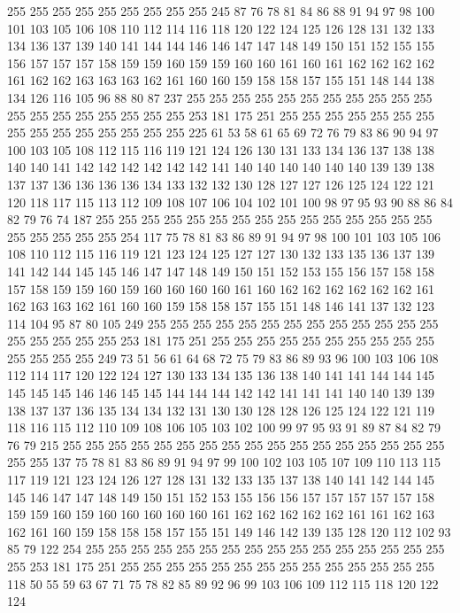 255 255 255 255 255 255 255 255 255 245 87 76 78 81 84 86 88 91 94 97
98 100 101 103 105 106 108 110 112 114 116 118 120 122 124 125 126 128 131 132
133 134 136 137 139 140 141 144 144 146 146 147 147 148 149 150 151 152 155 155
156 157 157 157 158 159 159 160 159 159 160 160 161 160 161 162 162 162 162 161
162 162 163 163 163 162 161 160 160 159 158 158 157 155 151 148 144 138 134 126
116 105 96 88 80 87 237 255 255 255 255 255 255 255 255 255 255 255 255 255
255 255 255 255 255 255 253 181 175 251 255 255 255 255 255 255 255 255 255 255
255 255 255 255 255 225 61 53 58 61 65 69 72 76 79 83 86 90 94 97
100 103 105 108 112 115 116 119 121 124 126 130 131 133 134 136 137 138 138 140
140 141 142 142 142 142 142 142 141 140 140 140 140 140 140 139 139 138 137 137
136 136 136 136 134 133 132 132 130 128 127 127 126 125 124 122 121 120 118 117
115 113 112 109 108 107 106 104 102 101 100 98 97 95 93 90 88 86 84 82
79 76 74 187 255 255 255 255 255 255 255 255 255 255 255 255 255 255 255 255
255 255 255 255 254 117 75 78 81 83 86 89 91 94 97 98 100 101 103 105
106 108 110 112 115 116 119 121 123 124 125 127 127 130 132 133 135 136 137 139
141 142 144 145 145 146 147 147 148 149 150 151 152 153 155 156 157 158 158 157
158 159 159 160 159 160 160 160 160 161 160 162 162 162 162 162 162 161 162 163
163 162 161 160 160 159 158 158 157 155 151 148 146 141 137 132 123 114 104 95
87 80 105 249 255 255 255 255 255 255 255 255 255 255 255 255 255 255 255 255
255 255 253 181 175 251 255 255 255 255 255 255 255 255 255 255 255 255 255 255
249 73 51 56 61 64 68 72 75 79 83 86 89 93 96 100 103 106 108 112
114 117 120 122 124 127 130 133 134 135 136 138 140 141 141 144 144 145 145 145
145 146 146 145 145 144 144 144 142 142 141 141 141 140 140 139 139 138 137 137
136 135 134 134 132 131 130 130 128 128 126 125 124 122 121 119 118 116 115 112
110 109 108 106 105 103 102 100 99 97 95 93 91 89 87 84 82 79 76 79
215 255 255 255 255 255 255 255 255 255 255 255 255 255 255 255 255 255 255 255
137 75 78 81 83 86 89 91 94 97 99 100 102 103 105 107 109 110 113 115
117 119 121 123 124 126 127 128 131 132 133 135 137 138 140 141 142 144 145 145
146 147 147 148 149 150 151 152 153 155 156 156 157 157 157 157 157 158 159 159
160 159 160 160 160 160 160 161 162 162 162 162 162 161 161 162 163 162 161 160
159 158 158 158 157 155 151 149 146 142 139 135 128 120 112 102 93 85 79 122
254 255 255 255 255 255 255 255 255 255 255 255 255 255 255 255 255 255 253 181
175 251 255 255 255 255 255 255 255 255 255 255 255 255 255 255 118 50 55 59
63 67 71 75 78 82 85 89 92 96 99 103 106 109 112 115 118 120 122 124
